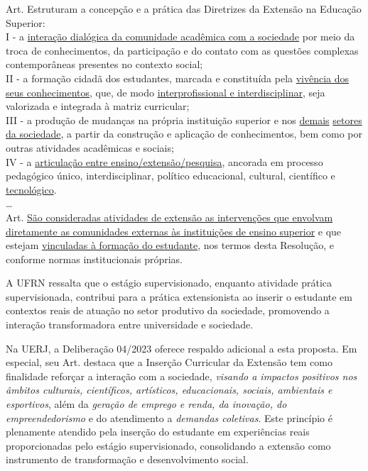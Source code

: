 \begin{itquotation}
    \noindent%
    Art.  Estruturam a concepção e a prática das Diretrizes da Extensão na Educação
    Superior:\\
    I - a \underline{interação dialógica da comunidade acadêmica com a sociedade} por meio da
    troca de conhecimentos, da participação e do contato com as questões complexas
    contemporâneas presentes no contexto social;\\
    II - a formação cidadã dos estudantes, marcada e constituída pela \underline{vivência dos} \underline{seus
        conhecimentos}, que, de modo \underline{interprofissional e interdisciplinar}, seja
    valorizada e integrada à matriz curricular;\\
    III - a produção de mudanças na própria instituição superior e nos \underline{demais} \underline{setores da
        sociedade}, a partir da construção e aplicação de conhecimentos, bem como por outras
    atividades acadêmicas e sociais;\\
    IV - a \underline{articulação entre ensino/extensão/pesquisa}, ancorada em processo pedagógico
    único, interdisciplinar, político educacional, cultural, científico e \underline{tecnológico}.\\
    \ldots\\
    Art.  \underline{São consideradas atividades de extensão as intervenções que envolvam} \underline{diretamente as comunidades externas às instituições de ensino superior} e que estejam \underline{vinculadas à formação do estudante},
    nos termos desta Resolução, e conforme normas institucionais próprias.
\end{itquotation}

A UFRN ressalta que o estágio supervisionado, enquanto atividade prática supervisionada, contribui para a prática extensionista ao inserir o estudante em contextos reais de atuação no setor produtivo da sociedade, promovendo a interação transformadora entre universidade e sociedade.

Na UERJ, a Deliberação  04/2023 oferece respaldo adicional a esta proposta. Em especial, seu Art.  destaca que a Inserção Curricular da Extensão tem como finalidade reforçar a interação com a sociedade, \textit{visando a impactos positivos nos âmbitos culturais, científicos, artísticos, educacionais, sociais, ambientais e esportivos}, além da \textit{geração de emprego e renda, da inovação, do empreendedorismo} e do atendimento a \textit{demandas coletivas}. Este princípio é plenamente atendido pela inserção do estudante em experiências reais proporcionadas pelo estágio supervisionado, consolidando a extensão como instrumento de transformação e desenvolvimento social.

